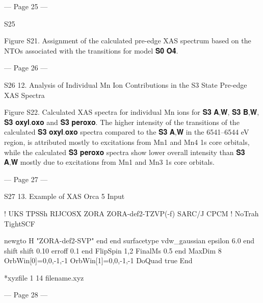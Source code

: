 --- Page 25 ---
 
S25 
 
Figure S21. Assignment of the calculated pre-edge XAS spectrum based on the NTOs associated with the 
transitions for model 𝐒𝟎
 𝐎𝟒. 
 
 
 
 
 
 
 
 
 


--- Page 26 ---
 
S26 
12. Analysis of Individual Mn Ion Contributions in the S3 State Pre-edge XAS 
Spectra 
 
Figure S22. Calculated XAS spectra for individual Mn ions for 𝐒𝟑
 𝐀,𝐖, 𝐒𝟑
 𝐁,𝐖, 𝐒𝟑
 𝐨𝐱𝐲𝐥.𝐨𝐱𝐨 and 𝐒𝟑
 𝐩𝐞𝐫𝐨𝐱𝐨. The higher 
intensity of the transitions of the calculated 𝐒𝟑
 𝐨𝐱𝐲𝐥.𝐨𝐱𝐨 spectra compared to the 𝐒𝟑
 𝐀,𝐖 in the 6541–6544 eV region, 
is attributed mostly to excitations from Mn1 and Mn4 1s core orbitals, while the calculated 𝐒𝟑
 𝐩𝐞𝐫𝐨𝐱𝐨 spectra show 
lower overall intensity than 𝐒𝟑
 𝐀,𝐖 mostly due to excitations from Mn1 and Mn3 1s core orbitals. 
 
 


--- Page 27 ---
 
S27 
13. Example of XAS Orca 5 Input  
 
! UKS TPSSh RIJCOSX ZORA ZORA-def2-TZVP(-f) SARC/J CPCM 
! NoTrah TightSCF 
 
       newgto H "ZORA-def2-SVP" end 
end 
    surfacetype vdw_gaussian 
    epsilon 6.0 
end 
     shift shift 0.10 erroff 0.1 end 
     FlipSpin 1,2 FinalMs 0.5 
end 
        MaxDim 8 
        OrbWin[0]=0,0,-1,-1 
        OrbWin[1]=0,0,-1,-1 
        DoQuad true 
End 
 
*xyzfile 1 14 filename.xyz 
 
 
 


--- Page 28 ---
 
